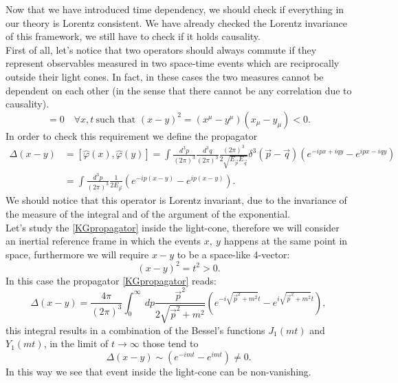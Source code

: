 Now that we have introduced time dependency, we should check if everything in our theory is Lorentz consistent. We have already checked the Lorentz invariance of this framework, we still have to check if it holds causality.\\First of all, let's notice that two operators should always commute if they represent observables measured in two space-time events which are reciprocally outside their light cones. In fact, in these cases the two measures cannot be dependent on each other (in the sense that there cannot be any correlation due to causality). 
\begin{equation}
    [\hat O_1(x),\hat O_2(y)]=0\quad \forall x,t\ \text{such that } (x-y)^2=(x^\mu-y^\mu)(x_\mu-y_\mu)<0. 
\end{equation} 
In order to check this requirement we define the propagator
\begin{align}
    \label{KGpropagator}\Delta(x-y)&=[\hat\varphi(x),\hat\varphi(y)]=\int\frac{d^3p}{(2\pi)^3}\frac{d^3q}{(2\pi)^3}\frac{(2\pi)^3}{2\sqrt{E_{\vec p}E_{\vec q}}}\delta^3(\vec p-\vec q)(e^{-ipx+iqy}-e^{ipx-iqy})\nonumber\\&=\int\frac{d^3p}{(2\pi)^3}\frac{1}{2E_{\vec p}}(e^{-ip(x-y)}-e^{ip(x-y)}).
\end{align}
We should notice that this operator is Lorentz invariant, due to the invariance of the measure of the integral and of the argument of the exponential.\\

Let's study the \eqref{KGpropagator} inside the light-cone, therefore we will consider an inertial reference frame in which the events $x,\ y$ happens at the same point in space, furthermore we will require $x-y$ to be a space-like 4-vector:
\begin{equation*}
    (x-y)^2=t^2>0.
\end{equation*}
In this case the propagator \eqref{KGpropagator} reads:
\begin{equation*}
    \Delta(x-y)=\frac{4\pi}{(2\pi)^3}\int_0^{\infty}\ dp\frac{\vec p^2}{2\sqrt{\vec p^2+m^2}}(e^{-i\sqrt{\vec p^2+m^2}t}-e^{i\sqrt{\vec p^2+m^2}t}),
\end{equation*}
this integral results in a combination of the Bessel's functions $J_1(mt)$ and $Y_1(mt)$, in the limit of $t\rightarrow\infty$ those tend to 
\begin{equation*}
    \Delta(x-y)\sim (e^{-imt}-e^{imt})\neq0.
\end{equation*}
In this way we see that event inside the light-cone can be non-vanishing.\\

